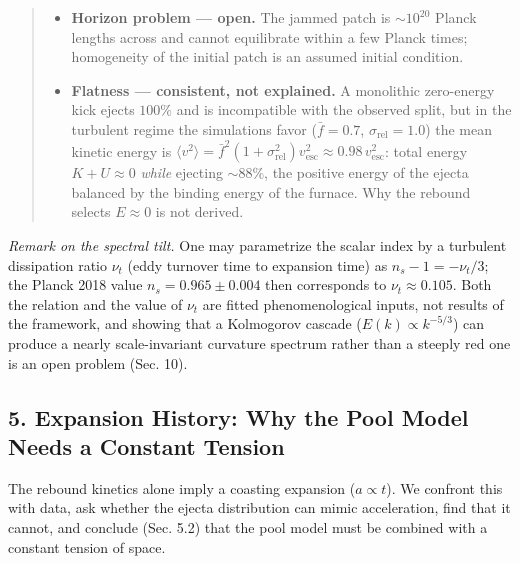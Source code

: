 \documentclass[
]{article}
\providecommand{\tightlist}{%
  \setlength{\itemsep}{0pt}\setlength{\parskip}{0pt}}
\begin{document}
\begin{quote}
\begin{itemize}
\tightlist
\item
  \textbf{Horizon problem --- open.} The jammed patch is
  \(\sim\!10^{20}\) Planck lengths across and cannot equilibrate within
  a few Planck times; homogeneity of the initial patch is an assumed
  initial condition.
\item
  \textbf{Flatness --- consistent, not explained.} A monolithic
  zero-energy kick ejects \(100\%\) and is incompatible with the
  observed split, but in the turbulent regime the simulations favor
  (\(\bar{f} = 0.7\), \(\sigma_{\text{rel}} = 1.0\)) the mean kinetic
  energy is
  \(\langle v^2\rangle = \bar{f}^2(1+\sigma_{\text{rel}}^2)v_{\text{esc}}^2 \approx 0.98\,v_{\text{esc}}^2\):
  total energy \(K + U \approx 0\) \emph{while} ejecting \(\sim\!88\%\),
  the positive energy of the ejecta balanced by the binding energy of
  the furnace. Why the rebound selects \(E \approx 0\) is not derived.
\end{itemize}
\end{quote}

\emph{Remark on the spectral tilt.} One may parametrize the scalar index
by a turbulent dissipation ratio \(\nu_t\) (eddy turnover time to
expansion time) as \(n_s - 1 = -\nu_t/3\); the Planck 2018 value
\(n_s = 0.965 \pm 0.004\) then corresponds to \(\nu_t \approx 0.105\).
Both the relation and the value of \(\nu_t\) are fitted phenomenological
inputs, not results of the framework, and showing that a Kolmogorov
cascade (\(E(k) \propto k^{-5/3}\)) can produce a nearly scale-invariant
curvature spectrum rather than a steeply red one is an open problem
(Sec. 10).

\hypertarget{expansion-history-why-the-pool-model-needs-a-constant-tension}{%
\subsection{\texorpdfstring{\textbf{5. Expansion History: Why the Pool
Model Needs a Constant
Tension}}{5. Expansion History: Why the Pool Model Needs a Constant Tension}}\label{expansion-history-why-the-pool-model-needs-a-constant-tension}}

The rebound kinetics alone imply a coasting expansion (\(a \propto t\)).
We confront this with data, ask whether the ejecta distribution can
mimic acceleration, find that it cannot, and conclude (Sec. 5.2) that
the pool model must be combined with a constant tension of space.
\end{document}

